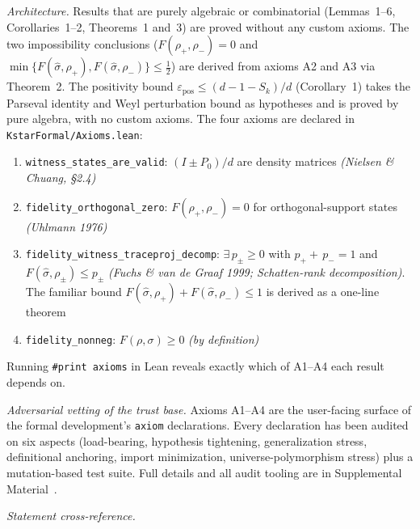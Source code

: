 \documentclass[twocolumn,prx,aps,superscriptaddress,longbibliography,floatfix]{revtex4-2}
\begin{document}
\medskip
\noindent\emph{Architecture.}
Results that are purely algebraic or combinatorial
(Lemmas~1--6, Corollaries~1--2, Theorems~1 and~3)
are proved without any custom axioms.
The two impossibility conclusions ($F(\rho_+,\rho_-)=0$ and
$\min\{F(\hat\sigma,\rho_+),F(\hat\sigma,\rho_-)\}\le\tfrac12$)
are derived from axioms A2 and A3 via Theorem~2.
The positivity bound
$\varepsilon_{\mathrm{pos}}\le(d{-}1{-}S_k)/d$ (Corollary~1)
takes the Parseval identity and Weyl perturbation bound as
hypotheses and is proved by pure algebra, with no custom axioms.
The four axioms are declared in \texttt{KstarFormal/Axioms.lean}:

\begin{enumerate}\setlength\itemsep{0pt}\emergencystretch=2em
\item[\textbf{A1.}] \texttt{witness\_states\_are\_valid}:
  $(I\pm P_0)/d$ are density matrices
  \emph{(Nielsen \& Chuang, \S2.4)}
\item[\textbf{A2.}] \texttt{fidelity\_orthogonal\_zero}:
  $F(\rho_+,\rho_-)=0$ for orthogonal-support states
  \emph{(Uhlmann 1976)}
\item[\textbf{A3.}] \texttt{fidelity\_witness\_traceproj\_decomp}:
  $\exists\, p_\pm \ge 0$ with $p_+ {+}\, p_- = 1$ and
  $F(\hat\sigma,\rho_\pm)\le p_\pm$
  \emph{(Fuchs \& van de Graaf 1999; Schatten-rank decomposition)}.
  The familiar bound
  $F(\hat\sigma,\rho_+){+}F(\hat\sigma,\rho_-)\le 1$
  is derived as a one-line theorem
\item[\textbf{A4.}] \texttt{fidelity\_nonneg}:
  $F(\rho,\sigma)\ge 0$
  \emph{(by definition)}
\end{enumerate}

\begin{sloppypar}\noindent
Running \texttt{\#print axioms} in Lean reveals exactly which of A1--A4 each result depends on.
\end{sloppypar}

\medskip
\noindent\emph{Adversarial vetting of the trust base.}
Axioms A1--A4 are the user-facing surface of the formal
development's \texttt{axiom} declarations. Every declaration
has been audited on six aspects (load-bearing, hypothesis
tightening, generalization stress, definitional anchoring,
import minimization, universe-polymorphism stress) plus a
mutation-based test suite.
Full details and all audit tooling are in
Supplemental Material~\cite{supplemental}.

\medskip
\noindent\emph{Statement cross-reference.}
\end{document}
